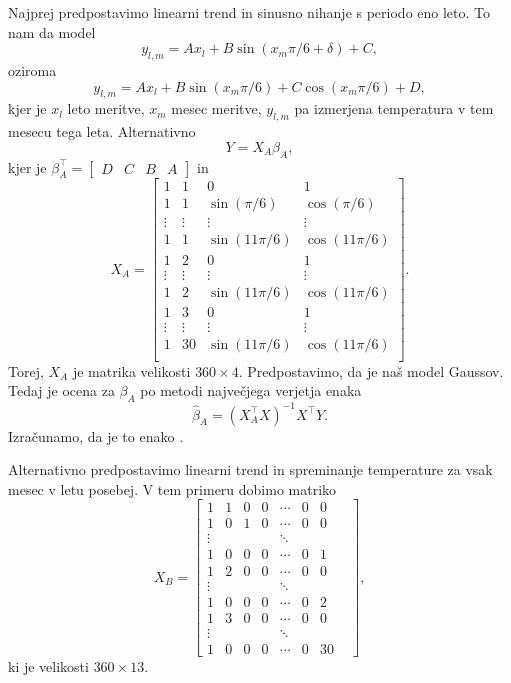\documentclass[12pt, a4paper]{article}
\begin{document}
Najprej predpostavimo linearni trend in sinusno nihanje s periodo eno leto. 
To nam da model
\[
    y_{l,m} = Ax_l + B\sin(x_m\pi/6 + \delta) + C,
\]
oziroma
\[
    y_{l,m} = Ax_l + B\sin(x_m\pi/6) + C\cos(x_m\pi/6) + D,
\]
kjer je $x_l$ leto meritve, $x_m$ mesec meritve, $y_{l,m}$ pa 
izmerjena temperatura v tem mesecu tega leta. Alternativno
\[
    Y = X_A\beta_A,
\]
kjer je $\beta_A^\top = \begin{bmatrix}
    D & C & B & A
\end{bmatrix}$ in
\[
    X_A = \begin{bmatrix}
        1 & 1 & 0 & 1 \\
        1 & 1 & \sin\left(\pi/6\right) & \cos\left(\pi/6\right) \\
        \vdots & \vdots & \vdots & \vdots \\
        1 & 1 &  \sin\left(11\pi/6\right) & \cos\left(11\pi/6\right) \\
        1 & 2 & 0 & 1 \\
        \vdots & \vdots & \vdots & \vdots \\
        1 & 2 &  \sin\left(11\pi/6\right) & \cos\left(11\pi/6\right) \\
        1 & 3 &  0 & 1 \\
        \vdots & \vdots & \vdots & \vdots \\
        1 & 30 & \sin\left(11\pi/6\right) & \cos\left(11\pi/6\right)\\
        \end{bmatrix}.
\]
Torej, $X_A$ je matrika velikosti $360 \times 4$. Predpostavimo, da je 
naš model Gaussov. Tedaj je ocena za $\beta_A$ po metodi največjega 
verjetja enaka
\[
    \hat \beta_A = (X_A^\top X)^{-1} X^\top Y.
\]
Izračunamo, da je to enako .

Alternativno predpostavimo linearni trend in spreminanje temperature za 
vsak mesec v letu posebej. V tem primeru dobimo matriko
\[
X_B = \begin{bmatrix}
        1 & 1 & 0 & 0 & \cdots & 0 & 0 \\
        1 & 0 & 1 & 0 & \cdots & 0 & 0 \\
        \vdots & & & & \ddots & & & \\
        1 & 0 & 0 & 0 & \cdots & 0 & 1 \\
        1 & 2 & 0 & 0 & \cdots & 0 & 0 \\
        \vdots & & & & \ddots & & & \\
        1 & 0 & 0 & 0 & \cdots & 0 & 2 \\
        1 & 3 & 0 & 0 & \cdots & 0 & 0 \\
        \vdots & & & & \ddots & & & \\
        1 & 0 & 0 & 0 & \cdots & 0 & 30 
    \end{bmatrix},
\]
ki je velikosti $360 \times 13$.
\end{document}
